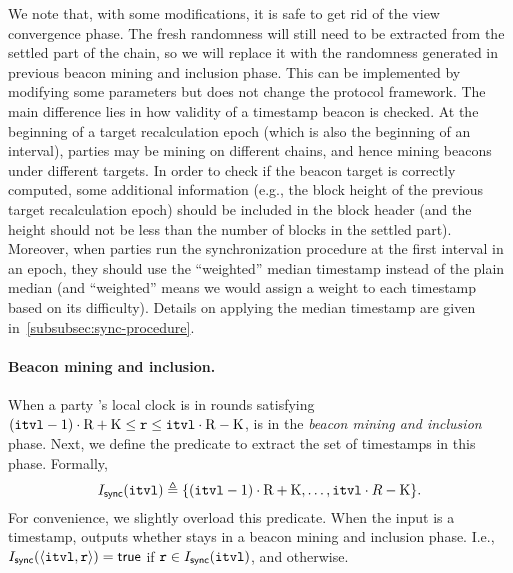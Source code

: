 \begin{remark} \label{remark:omit-view-convergence-phase}
    We note that, with some modifications, it is safe to get rid of the view convergence phase.
    The fresh randomness will still need to be extracted from the settled part of the chain, so we will replace it with the randomness generated in previous beacon mining and inclusion phase.
    This can be implemented by modifying some parameters but does not change the protocol framework.
    The main difference lies in how validity of a timestamp beacon is checked.
    At the beginning of a target recalculation epoch (which is also the beginning of an interval), parties may be mining on different chains, and hence mining beacons under different targets.
    In order to check if the beacon target is correctly computed, some additional information (e.g., the block height of the previous target recalculation epoch) should be included in the block header (and the height should not be less than the number of blocks in the settled part).
    Moreover, when parties run the synchronization procedure at the first interval in an epoch, they should use the ``weighted'' median timestamp instead of the plain median (and ``weighted'' means we would assign a weight to each timestamp based on its difficulty).
    Details on applying the median timestamp are given in~\cref{subsubsec:sync-procedure}.
\end{remark}

\paragraph{Beacon mining and inclusion.}
%
When a party \party's local clock is in rounds \protocolTime{\interval}{\round} satisfying $(\mathtt{itvl} - 1) \cdot \mathrm{R} + \mathrm{K} \le \mathtt{r} \le \mathtt{itvl} \cdot \mathrm{R} - \mathrm{K}$, \party is in the \emph{beacon mining and inclusion} phase.
%
Next, we define the predicate \Isync{\interval} to extract the set of timestamps in this phase.
%
Formally,
%
\begin{equation} \label{eq:isync-def}
    I_{\mathsf{sync}}({\mathtt{itvl}}) \triangleq \{(\mathtt{itvl} - 1) \cdot \mathrm{R} + \mathrm{K}, \ldots, \mathtt{itvl} \cdot R - \mathrm{K} \}.
\end{equation}
%
For convenience, we slightly overload this predicate.
%
When the input is a timestamp, \Isync{\protocolTime{\interval}{\round}} outputs whether \protocolTime{\interval}{\round} stays in a beacon mining and inclusion phase.
%
I.e.,  $I_{\mathsf{sync}}({\langle \mathtt{itvl}, \mathtt{r} \rangle}) = \mathsf{true}$ if $\mathtt{r} \in I_{\mathsf{sync}}({\mathtt{itvl}})$, and \false otherwise.

